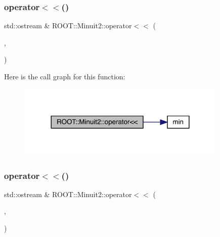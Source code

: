 \mbox{\label{namespaceROOT_1_1Minuit2_a38083dea2c583232d8c33ed056b555ef}} 
\subsubsection{\texorpdfstring{operator$<$$<$()}{operator<<()}\hspace{0.1cm}{\footnotesize\ttfamily [1/11]}}
{\footnotesize\ttfamily std\+::ostream \& R\+O\+O\+T\+::\+Minuit2\+::operator$<$$<$ (\begin{DoxyParamCaption}\item[{std\+::ostream \&}]{,  }\item[{const \mbox{\hyperlink{classROOT_1_1Minuit2_1_1FunctionMinimum}{Function\+Minimum}} \&}]{ }\end{DoxyParamCaption})}

Here is the call graph for this function\+:
\nopagebreak
\begin{figure}[H]
\begin{center}
\leavevmode
\includegraphics[width=284pt]{d6/d3a/namespaceROOT_1_1Minuit2_a38083dea2c583232d8c33ed056b555ef_cgraph}
\end{center}
\end{figure}
\mbox{\label{namespaceROOT_1_1Minuit2_a172c627b1d5fd6191ca54f94090cd304}} 
\subsubsection{\texorpdfstring{operator$<$$<$()}{operator<<()}\hspace{0.1cm}{\footnotesize\ttfamily [2/11]}}
{\footnotesize\ttfamily std\+::ostream \& R\+O\+O\+T\+::\+Minuit2\+::operator$<$$<$ (\begin{DoxyParamCaption}\item[{std\+::ostream \&}]{,  }\item[{const \mbox{\hyperlink{classROOT_1_1Minuit2_1_1MinimumState}{Minimum\+State}} \&}]{ }\end{DoxyParamCaption})}

